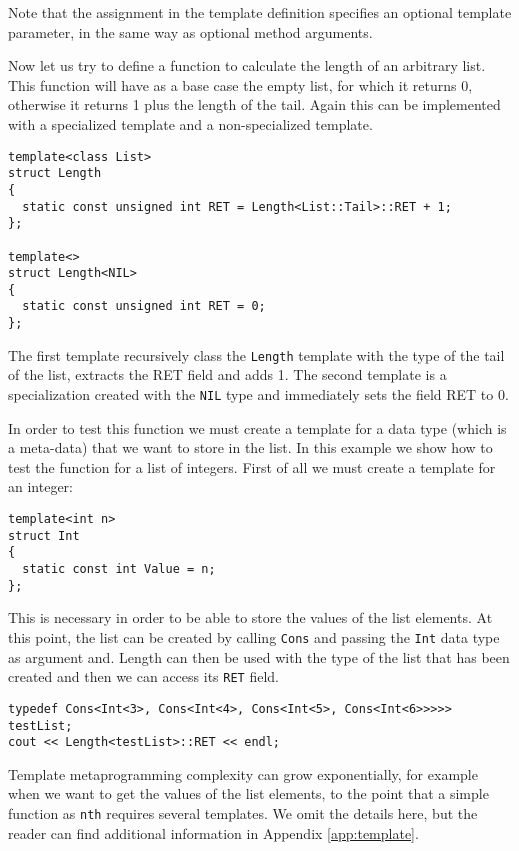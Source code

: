 \noindent
Note that the assignment in the template definition specifies an optional template parameter, in the same way as optional method arguments. 

Now let us try to define a function to calculate the length of an arbitrary list. This function will have as a base case the empty list, for which it returns 0, otherwise it returns 1 plus the length of the tail. Again this can be implemented with a specialized template and a non-specialized template.

\begin{lstlisting}
template<class List>
struct Length
{
  static const unsigned int RET = Length<List::Tail>::RET + 1;
};

template<>
struct Length<NIL>
{
  static const unsigned int RET = 0;
};
\end{lstlisting}

\noindent
The first template recursively class the \texttt{Length} template with the type of the tail of the list, extracts the RET field and adds 1. The second template is a specialization created with the \texttt{NIL} type and immediately sets the field RET to 0.

In order to test this function we must create a template for a data type (which is a meta-data) that we want to store in the list. In this example we show how to test the function for a list of integers. First of all we must create a template for an integer:

\begin{lstlisting}
template<int n>
struct Int
{
  static const int Value = n;
};
\end{lstlisting}

\noindent
This is necessary in order to be able to store the values of the list elements. At this point, the list can be created by calling \texttt{Cons} and passing the \texttt{Int} data type as argument and. Length can then be used with the type of the list that has been created and then we can access its \texttt{RET} field.

\begin{lstlisting}
typedef Cons<Int<3>, Cons<Int<4>, Cons<Int<5>, Cons<Int<6>>>>> testList;
cout << Length<testList>::RET << endl;
\end{lstlisting} 

Template metaprogramming complexity can grow exponentially, for example when we want to get the values of the list elements, to the point that a simple function as \texttt{nth} requires several templates. We omit the details here, but the reader can find additional information in Appendix \ref{app:template}.
